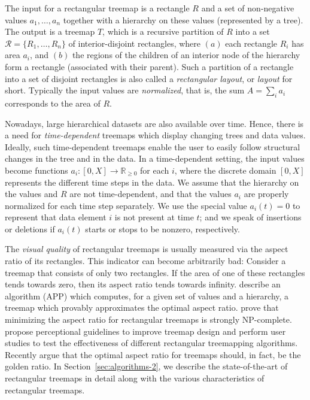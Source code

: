 The input for a rectangular treemap is a rectangle $R$ and a set of non-negative values $a_1, \ldots, a_n$ together with a hierarchy on these values (represented by a tree). The output is a treemap $T$, which is a recursive partition of $R$ into a set $\mathcal{R}=\{R_1, \ldots, R_n \}$ of interior-disjoint rectangles, where $(a)$ each rectangle $R_i$ has area $a_i$, and $(b)$ the regions of the children of an interior node of the hierarchy form a rectangle (associated with their parent). Such a partition of a rectangle into a set of disjoint rectangles is also called a \emph{rectangular layout}, or \emph{layout} for short. Typically the input values are \emph{normalized}, that is, the sum $A = \sum_i a_i$ corresponds to the area of $R$.

Nowadays, large hierarchical datasets are also available over time. Hence, there is a need for \emph{time-dependent} treemaps which display changing trees and data values. Ideally, such time-dependent treemaps enable the user to easily follow structural changes in the tree and in the data. In a time-dependent setting, the input values become functions $a_i\colon [0, X] \rightarrow \mathbb{R}_{\geq 0}$ for each $i$, where the discrete domain $[0, X]$ represents the different time steps in the data. We assume that the hierarchy on the values and $R$ are not time-dependent, and that the values $a_i$ are properly normalized for each time step separately. We use the special value $a_i(t) = 0$ to represent that data element $i$ is not present at time $t$; and we speak of insertions or deletions if $a_i(t)$ starts or stops to be nonzero, respectively.

The \emph{visual quality} of rectangular treemaps is usually measured via the aspect ratio of its rectangles. This indicator can become arbitrarily bad: Consider a treemap that consists of only two rectangles. If the area of one of these rectangles tends towards zero, then its aspect ratio tends towards infinity. \cite{nagamochi07} describe an algorithm (APP) which computes, for a given set of values and a hierarchy, a treemap which provably approximates the optimal aspect ratio. \cite{deberg14} prove that minimizing the aspect ratio for rectangular treemaps is strongly NP-complete. ~\cite{Kong2010} propose perceptional guidelines to improve treemap design and \cite{Zhou2017} perform user studies to test the effectiveness of different rectangular treemapping algorithms. Recently \cite{lu2017golden} argue that the optimal aspect ratio for treemaps should, in fact, be the golden ratio. In Section~\ref{sec:algorithms-2}, we describe the state-of-the-art of rectangular treemaps in detail along with the various characteristics of rectangular treemaps.

